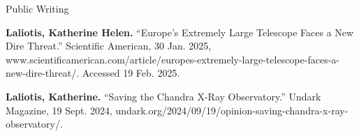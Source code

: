 \documentclass{resume} %
\begin{document}


\begin{rSection}{Public Writing}

\item \textbf{Laliotis, Katherine Helen.} “Europe’s Extremely Large Telescope Faces a New Dire Threat.” Scientific American, 30 Jan. 2025, www.scientificamerican.com/article/europes-extremely-large-telescope-faces-a-new-dire-threat/. Accessed 19 Feb. 2025.

\item \textbf{Laliotis, Katherine. }“Saving the Chandra X-Ray Observatory.” Undark Magazine, 19 Sept. 2024, undark.org/2024/09/19/opinion-saving-chandra-x-ray-observatory/.

\end{rSection}


\end{document}
